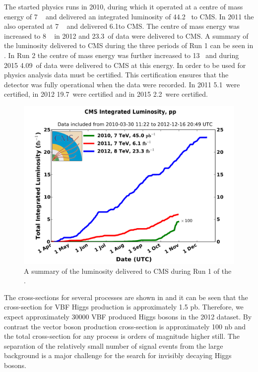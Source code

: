 The \LHC started physics runs in 2010, during which it operated at a centre of mass energy of 7 \TeV~ and delivered an integrated luminosity of 44.2 \invpb ~to CMS. In 2011 the \LHC also operated at 7 \TeV~ and delivered 6.1\invfb to CMS. The centre of mass energy was increased to 8 \TeV~ in 2012 and 23.3\invfb~of data were delivered to CMS. A summary of the luminosity delivered to CMS during the three periods of Run 1 can be seen in . In Run 2 the centre of mass energy was further increased to 13 \TeV~and during 2015 4.09\invfb~of data were delivered to CMS at this energy. In order to be used for physics analysis data must be certified. This certification ensures that the detector was fully operational when the data were recorded. In 2011 5.1\invfb~were certified, in 2012 19.7\invfb~were certified and in 2015 2.2\invfb~were certified.


\begin{figure}
  \includegraphics[width=1.2\largefigwidth]{plots/detector/int_lumi_cumulative_pp_2.pdf}
  \caption{A summary of the luminosity delivered to CMS during Run 1 of the \LHC \cite{CMSLumiPublic}.}
  \label{fig:lumisummary}
\end{figure}

The cross-sections for several processes are shown in  and it can be seen that the cross-section for VBF Higgs production is approximately 1.5 pb. Therefore, we expect approximately 30000 VBF produced Higgs bosons in the 2012 dataset. By contrast the vector boson production cross-section is approximately 100 nb and the total cross-section for any process is orders of magnitude higher still. The separation of the relatively small number of signal events from the large background is a major challenge for the search for invisibly decaying Higgs bosons.

